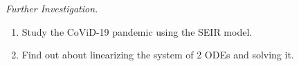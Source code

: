 \vfill


\emph{Further Investigation. } 
\begin{enumerate}[label=\emph{\arabic*.}]
\item Study the CoViD-19 pandemic using the SEIR model.
\item Find out about linearizing the system of 2 ODEs and solving it.
\end{enumerate}

\begin{noexercises}
\end{noexercises}

